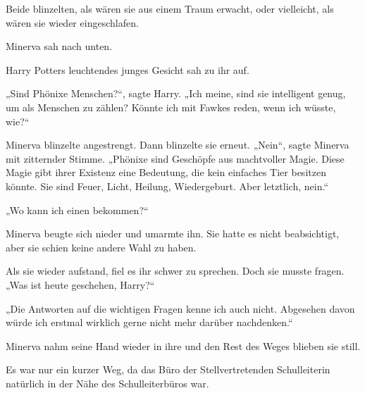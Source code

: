 Beide blinzelten, als wären sie aus einem Traum erwacht, oder vielleicht, als wären sie wieder eingeschlafen.

Minerva sah nach unten.

Harry Potters leuchtendes junges Gesicht sah zu ihr auf.

„Sind Phönixe Menschen?“, sagte Harry. „Ich meine, sind sie intelligent genug, um als Menschen zu zählen? Könnte ich mit Fawkes reden, wenn ich wüsste, wie?“

Minerva blinzelte angestrengt. Dann blinzelte sie erneut. „Nein“, sagte Minerva mit zitternder Stimme. „Phönixe sind Geschöpfe aus machtvoller Magie. Diese Magie gibt ihrer Existenz eine Bedeutung, die kein einfaches Tier besitzen könnte. Sie sind Feuer, Licht, Heilung, Wiedergeburt. Aber letztlich, nein.“

„Wo kann ich einen bekommen?“

Minerva beugte sich nieder und umarmte ihn. Sie hatte es nicht beabsichtigt, aber sie schien keine andere Wahl zu haben.

Als sie wieder aufstand, fiel es ihr schwer zu sprechen. Doch sie musste fragen. „Was ist heute geschehen, Harry?“

„Die Antworten auf die wichtigen Fragen kenne ich auch nicht. Abgesehen davon würde ich erstmal wirklich gerne nicht mehr darüber nachdenken.“

Minerva nahm seine Hand wieder in ihre und den Rest des Weges blieben sie still.

Es war nur ein kurzer Weg, da das Büro der Stellvertretenden Schulleiterin natürlich in der Nähe des Schulleiterbüros war.


